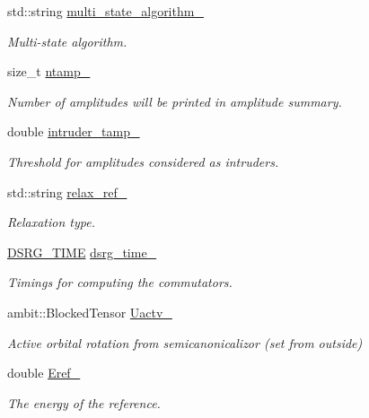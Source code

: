 \begin{DoxyCompactItemize}
std\+::string \mbox{\hyperlink{classforte_1_1_m_a_s_t_e_r___d_s_r_g_a758d3ccd9bd1502fb5f9cd05bbcd0d3c}{multi\+\_\+state\+\_\+algorithm\+\_\+}}
\begin{DoxyCompactList}\small\item\em Multi-\/state algorithm. \end{DoxyCompactList}\item 
size\+\_\+t \mbox{\hyperlink{classforte_1_1_m_a_s_t_e_r___d_s_r_g_aeef1ddb3a5393cb0071bb8e43e59e345}{ntamp\+\_\+}}
\begin{DoxyCompactList}\small\item\em Number of amplitudes will be printed in amplitude summary. \end{DoxyCompactList}\item 
double \mbox{\hyperlink{classforte_1_1_m_a_s_t_e_r___d_s_r_g_af11c20fd15b4e9c830418cfcaced4adf}{intruder\+\_\+tamp\+\_\+}}
\begin{DoxyCompactList}\small\item\em Threshold for amplitudes considered as intruders. \end{DoxyCompactList}\item 
std\+::string \mbox{\hyperlink{classforte_1_1_m_a_s_t_e_r___d_s_r_g_a072afa03cc0d6163890259fc6c78547f}{relax\+\_\+ref\+\_\+}}
\begin{DoxyCompactList}\small\item\em Relaxation type. \end{DoxyCompactList}\item 
\mbox{\hyperlink{classforte_1_1_d_s_r_g___t_i_m_e}{D\+S\+R\+G\+\_\+\+T\+I\+ME}} \mbox{\hyperlink{classforte_1_1_m_a_s_t_e_r___d_s_r_g_aba8c28a5b79352f06f7b89aa6a276bd0}{dsrg\+\_\+time\+\_\+}}
\begin{DoxyCompactList}\small\item\em Timings for computing the commutators. \end{DoxyCompactList}\item 
ambit\+::\+Blocked\+Tensor \mbox{\hyperlink{classforte_1_1_m_a_s_t_e_r___d_s_r_g_a6fb4456b42a95a5f1c0d2637917b0d0e}{Uactv\+\_\+}}
\begin{DoxyCompactList}\small\item\em Active orbital rotation from semicanonicalizor (set from outside) \end{DoxyCompactList}\item 
double \mbox{\hyperlink{classforte_1_1_m_a_s_t_e_r___d_s_r_g_ac6cd83261c5460f648c9da8ae61e3d15}{Eref\+\_\+}}
\begin{DoxyCompactList}\small\item\em The energy of the reference. \end{DoxyCompactList}\item 

\end{DoxyCompactItemize}
